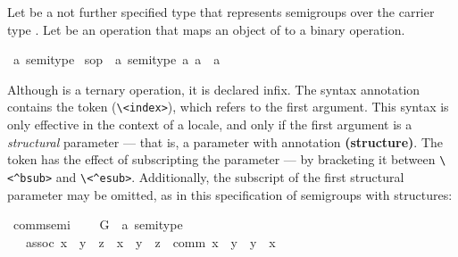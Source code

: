 \begin{isabellebody}
\begin{isamarkuptext}
  Let  be a not further specified type that
  represents semigroups over the carrier type .  Let  be an operation that maps an object of  to
  a binary operation.%
\end{isamarkuptext}%
\isamarkuptrue%
\isamarkupfalse%
\ {\isacharprime}a\ semi{\isacharunderscore}type\isanewline
{}\isamarkupfalse%
\ s{\isacharunderscore}op\ {\isacharcolon}{\isacharcolon}\ {\isachardoublequoteopen}{\isacharbrackleft}{\isacharprime}a\ semi{\isacharunderscore}type{\isacharcomma}\ {\isacharprime}a{\isacharcomma}\ {\isacharprime}a{\isacharbrackright}\ {\isasymRightarrow}\ {\isacharprime}a{\isachardoublequoteclose}\ {\isacharparenleft}\ {\isachardoublequoteopen}{\isasymstar}{\isasymindex}{\isachardoublequoteclose}\ {}{}{\isacharparenright}%
\begin{isamarkuptext}%
Although  is a ternary operation, it is declared
  infix.  The syntax annotation contains the token  \isa{{\isasymindex}}
  (\verb.\<index>.), which refers to the first argument.  This syntax is only
  effective in the context of a locale, and only if the first argument
  is a
  \emph{structural} parameter --- that is, a parameter with annotation
  \textbf{(structure)}.  The token has the effect of subscripting the
  parameter --- by bracketing it between \verb.\<^bsub>. and  \verb.\<^esub>..
  Additionally, the subscript of the first structural parameter may be
  omitted, as in this specification of semigroups with structures:%
\end{isamarkuptext}%
\isamarkuptrue%
\isamarkupfalse%
\ comm{\isacharunderscore}semi{\isacharprime}\ {\isacharequal}\isanewline
\ \ \ G\ {\isacharcolon}{\isacharcolon}\ {\isachardoublequoteopen}{\isacharprime}a\ semi{\isacharunderscore}type{\isachardoublequoteclose}\ {\isacharparenleft}\isanewline
\ \ \ assoc{\isacharcolon}\ {\isachardoublequoteopen}{\isacharparenleft}x\ {\isasymstar}\ y{\isacharparenright}\ {\isasymstar}\ z\ {\isacharequal}\ x\ {\isasymstar}\ {\isacharparenleft}y\ {\isasymstar}\ z{\isacharparenright}{\isachardoublequoteclose}\ \ comm{\isacharcolon}\ {\isachardoublequoteopen}x\ {\isasymstar}\ y\ {\isacharequal}\ y\ {\isasymstar}\ x{\isachardoublequoteclose}%
\begin{isamarkuptext}%

\end{isamarkuptext}
\end{isabellebody}
